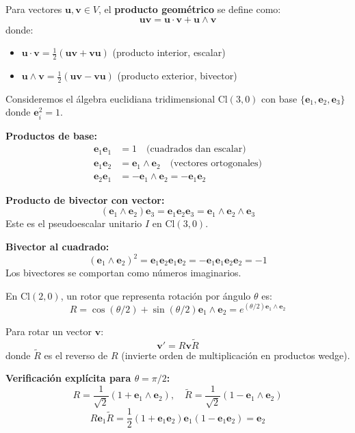 \begin{definition}\label{def:producto_geometrico_cnn}
Para vectores $\mathbf{u}, \mathbf{v} \in V$, el \textbf{producto geométrico} se define como:
\[\mathbf{u}\mathbf{v} = \mathbf{u} \cdot \mathbf{v} + \mathbf{u} \wedge \mathbf{v}\]
donde:
\begin{itemize}
    \item $\mathbf{u} \cdot \mathbf{v} = \frac{1}{2}(\mathbf{u}\mathbf{v} + \mathbf{v}\mathbf{u})$ (producto interior, escalar)
    \item $\mathbf{u} \wedge \mathbf{v} = \frac{1}{2}(\mathbf{u}\mathbf{v} - \mathbf{v}\mathbf{u})$ (producto exterior, bivector)
\end{itemize}
\end{definition}

\begin{example}\label{ex:productos_cl30}
Consideremos el álgebra euclidiana tridimensional $\text{Cl}(3,0)$ con base $\{\mathbf{e}_1, \mathbf{e}_2, \mathbf{e}_3\}$ donde $\mathbf{e}_i^2 = 1$.

\textbf{Productos de base:}
\begin{align}
\mathbf{e}_1 \mathbf{e}_1 &= 1 \quad \text{(cuadrados dan escalar)} \\
\mathbf{e}_1 \mathbf{e}_2 &= \mathbf{e}_1 \wedge \mathbf{e}_2 \quad \text{(vectores ortogonales)} \\
\mathbf{e}_2 \mathbf{e}_1 &= -\mathbf{e}_1 \wedge \mathbf{e}_2 = -\mathbf{e}_1 \mathbf{e}_2
\end{align}

\textbf{Producto de bivector con vector:}
\[(\mathbf{e}_1 \wedge \mathbf{e}_2) \mathbf{e}_3 = \mathbf{e}_1 \mathbf{e}_2 \mathbf{e}_3 = \mathbf{e}_1 \wedge \mathbf{e}_2 \wedge \mathbf{e}_3\]
Este es el pseudoescalar unitario $I$ en $\text{Cl}(3,0)$.

\textbf{Bivector al cuadrado:}
\[(\mathbf{e}_1 \wedge \mathbf{e}_2)^2 = \mathbf{e}_1 \mathbf{e}_2 \mathbf{e}_1 \mathbf{e}_2 = -\mathbf{e}_1 \mathbf{e}_1 \mathbf{e}_2 \mathbf{e}_2 = -1\]
Los bivectores se comportan como números imaginarios.
\end{example}

\begin{example}[Rotores en 2D]\label{ex:rotores_2d}
En $\text{Cl}(2,0)$, un rotor que representa rotación por ángulo $\theta$ es:
\[R = \cos(\theta/2) + \sin(\theta/2) \mathbf{e}_1 \wedge \mathbf{e}_2 = e^{(\theta/2) \mathbf{e}_1 \wedge \mathbf{e}_2}\]

Para rotar un vector $\mathbf{v}$:
\[\mathbf{v}' = R \mathbf{v} \widetilde{R}\]
donde $\widetilde{R}$ es el reverso de $R$ (invierte orden de multiplicación en productos wedge).

\textbf{Verificación explícita para $\theta = \pi/2$:}
\[R = \frac{1}{\sqrt{2}}(1 + \mathbf{e}_1 \wedge \mathbf{e}_2), \quad \widetilde{R} = \frac{1}{\sqrt{2}}(1 - \mathbf{e}_1 \wedge \mathbf{e}_2)\]
\[R \mathbf{e}_1 \widetilde{R} = \frac{1}{2}(1 + \mathbf{e}_1 \mathbf{e}_2) \mathbf{e}_1 (1 - \mathbf{e}_1 \mathbf{e}_2) = \mathbf{e}_2\]
\end{example}

